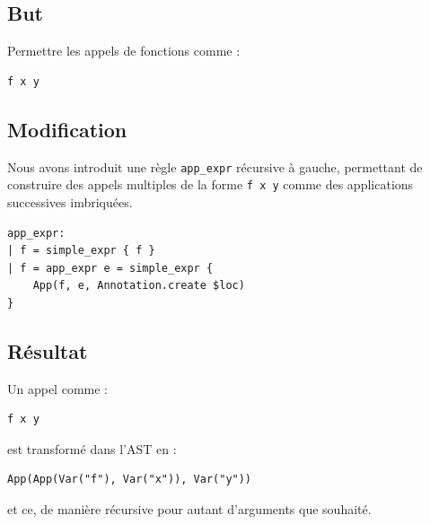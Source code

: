 \subsection*{But}
Permettre les appels de fonctions comme :
\begin{lstlisting}
f x y
\end{lstlisting}

\subsection*{Modification}
Nous avons introduit une règle \texttt{app\_expr} récursive à gauche, permettant de construire des appels multiples de la forme \texttt{f x y} comme des applications successives imbriquées.

\begin{lstlisting}
app_expr:
| f = simple_expr { f }
| f = app_expr e = simple_expr {
    App(f, e, Annotation.create $loc)
}
\end{lstlisting}

\subsection*{Résultat}
Un appel comme :
\begin{lstlisting}
f x y
\end{lstlisting}
est transformé dans l’AST en :
\begin{lstlisting}
App(App(Var("f"), Var("x")), Var("y"))
\end{lstlisting}
et ce, de manière récursive pour autant d'arguments que souhaité.